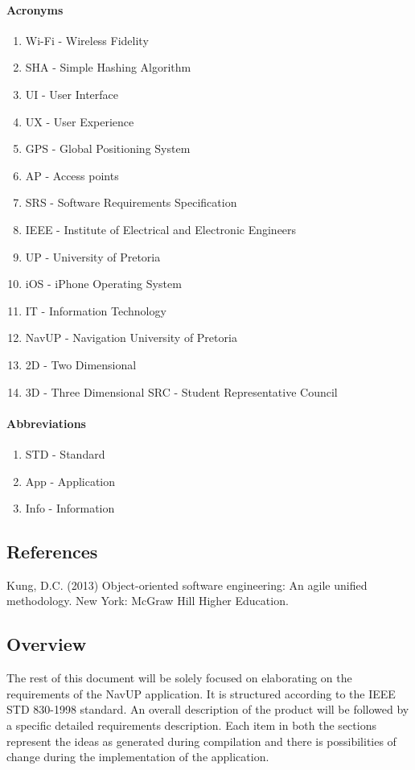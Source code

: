 \documentclass[runningheads,a4paper]{article}
\begin{document}
\paragraph{\textbf{Acronyms}}
\begin{enumerate}
	\item Wi-Fi - Wireless Fidelity 
	\item SHA - Simple Hashing Algorithm
	\item UI - User Interface
	\item UX - User Experience
	\item GPS - Global Positioning System
	\item AP - Access points
	\item SRS - Software Requirements Specification
	\item IEEE - Institute of Electrical and Electronic Engineers 
	\item UP - University of Pretoria
	\item iOS - iPhone Operating System 
	\item IT - Information Technology
	\item NavUP - Navigation University of Pretoria
	\item 2D - Two Dimensional
	\item 3D - Three Dimensional
	\itme SRC - Student Representative Council
\end{enumerate}

\paragraph{\textbf{Abbreviations}}
\begin{enumerate}
	\item STD - Standard
	\item App - Application
	\item Info - Information
\end{enumerate}

\subsection{References}
Kung, D.C. (2013) Object-oriented software engineering: An agile unified methodology. New York: McGraw Hill Higher Education.

\subsection{Overview}
The rest of this document will be solely focused on elaborating on the requirements of the NavUP application. It is structured according to the IEEE STD 830-1998 standard. An overall description of the product will be followed by a specific detailed requirements description. Each item in both the sections represent the ideas as generated during compilation and there is possibilities of change during the implementation of the application.
\end{document}
